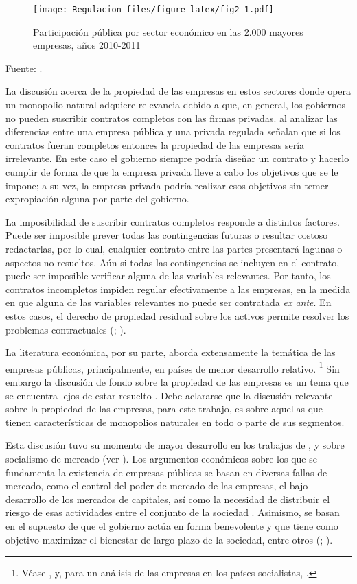 \documentclass[
  12pt,
  spanish,
]{book}
\begin{document}
\begin{figure}
\centering
\texttt{[image: Regulacion\_files/figure-latex/fig2-1.pdf]}
\caption{Participación pública por sector económico en las 2.000 mayores
empresas, años 2010-2011}
\end{figure}

Fuente: \citet{Kowalski2013}.

La discusión acerca de la propiedad de las empresas en estos sectores
donde opera un monopolio natural adquiere relevancia debido a que, en
general, los gobiernos no pueden suscribir contratos completos con las
firmas privadas. \citet{Laffont1993} al analizar las diferencias entre
una empresa pública y una privada regulada señalan que si los contratos
fueran completos entonces la propiedad de las empresas sería
irrelevante. En este caso el gobierno siempre podría diseñar un contrato
y hacerlo cumplir de forma de que la empresa privada lleve a cabo los
objetivos que se le impone; a su vez, la empresa privada podría realizar
esos objetivos sin temer expropiación alguna por parte del gobierno.

La imposibilidad de suscribir contratos completos responde a distintos
factores. Puede ser imposible prever todas las contingencias futuras o
resultar costoso redactarlas, por lo cual, cualquier contrato entre las
partes presentará lagunas o aspectos no resueltos. Aún si todas las
contingencias se incluyen en el contrato, puede ser imposible verificar
alguna de las variables relevantes. Por tanto, los contratos incompletos
impiden regular efectivamente a las empresas, en la medida en que alguna
de las variables relevantes no puede ser contratada \emph{ex ante}. En
estos casos, el derecho de propiedad residual sobre los activos permite
resolver los problemas contractuales (\citet{Hart1995};
\citet{Perotti2004}).

La literatura económica, por su parte, aborda extensamente la temática
de las empresas públicas, principalmente, en países de menor desarrollo
relativo. \footnote{Véase \citet{Jones1982}, \citet{WorldBank1995} y,
  para un análisis de las empresas en los países socialistas,
  \citet{Roland2000}.} Sin embargo la discusión de fondo sobre la
propiedad de las empresas es un tema que se encuentra lejos de estar
resuelto \citep{Hart2003}. Debe aclararse que la discusión relevante
sobre la propiedad de las empresas, para este trabajo, es sobre aquellas
que tienen características de monopolios naturales en todo o parte de
sus segmentos.

Esta discusión tuvo su momento de mayor desarrollo en los trabajos de
\citet{Lange1936}, \citet{Lange1937} y \citet{Lerner1944} sobre
socialismo de mercado (ver \citet{Coloma2004}). Los argumentos
económicos sobre los que se fundamenta la existencia de empresas
públicas se basan en diversas fallas de mercado, como el control del
poder de mercado de las empresas, el bajo desarrollo de los mercados de
capitales, así como la necesidad de distribuir el riesgo de esas
actividades entre el conjunto de la sociedad \citep{Sappington1987}.
Asimismo, se basan en el supuesto de que el gobierno actúa en forma
benevolente y que tiene como objetivo maximizar el bienestar de largo
plazo de la sociedad, entre otros (\citet{Dixit1997};
\citet{Martimort2006}).
\end{document}
